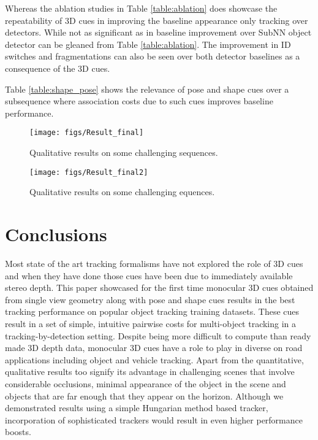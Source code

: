 \documentclass[letterpaper, 10 pt, conference]{ieeeconf}
\begin{document}
Whereas the ablation studies in Table \ref{table:ablation} does showcase the repeatability of 3D cues in improving the baseline appearance only tracking over detectors. While not as significant as in \cite{RRC} baseline improvement over SubNN object detector\cite{SubCNN} can be gleaned from Table \ref{table:ablation}. The improvement in ID switches and fragmentations can also be seen over both detector baselines as a consequence of the 3D cues. 

Table \ref{table:shape_pose} shows the relevance of pose and shape cues over a subsequence where association costs due to such cues improves baseline performance. 

\begin{figure*}[!t]
\centering
\texttt{[image: figs/Result\_final]}
\caption{Qualitative results on some challenging sequences.}
\label{fig:qualitative}
\end{figure*}

\begin{figure*}[!t]
\centering
\texttt{[image: figs/Result\_final2]}
\caption{Qualitative results on some challenging equences.}
\label{fig:qualitative2}
\end{figure*}


\section{Conclusions}

Most state of the art tracking formalisms have not explored the role of 3D cues and when they have done those cues have been due to immediately available stereo depth. This paper showcased for the first time monocular 3D cues obtained from single view geometry along with pose and shape cues results in the best tracking performance on popular object tracking training datasets. These cues result in a set of simple, intuitive pairwise costs for multi-object tracking in a tracking-by-detection setting. Despite being more difficult to compute than ready made 3D depth data, monocular 3D cues have a role to play in diverse on road applications including object and vehicle tracking. Apart from the quantitative,  qualitative  results too signify its advantage in challenging scenes that involve considerable occlusions, minimal appearance of the object in the scene and objects that are far enough that they appear on the horizon. Although we demonstrated results using a simple Hungarian method based tracker, incorporation of sophisticated trackers would result in even higher performance boosts. 








\end{document}
